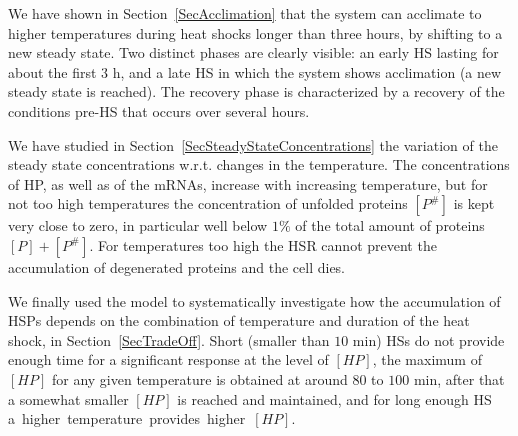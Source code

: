 \documentclass[oneside, 10pt, a4paper, twocolumn]{article}
\begin{document}
We have shown in Section~\ref{SecAcclimation} that the system can {acclimate} to higher temperatures during heat shocks longer than three hours, by shifting to a new steady state. Two distinct phases are clearly visible: an early HS lasting for about the first $3$ h, and a late HS in which the system shows acclimation (a new steady state is reached). The recovery phase is characterized by a recovery of the conditions pre-HS that occurs over several hours. 
 
We have studied in Section~\ref{SecSteadyStateConcentrations} the variation of the steady state concentrations w.r.t. changes in the temperature. The concentrations of HP, as well as of the mRNAs, increase with increasing temperature, but for not too high temperatures the concentration of unfolded proteins $\left[P^\#\right]$ is kept very close to zero, in particular well below $1\%$ of the total amount of proteins $\left[P\right] + \left[P^\#\right]$. For temperatures too high the HSR cannot prevent the accumulation of degenerated proteins and the cell dies.

We finally used the model to systematically investigate how the accumulation of HSPs depends on the combination of temperature and duration of the heat shock, in Section~\ref{SecTradeOff}. Short (smaller than $10$ min) HSs do not provide enough time for a significant response at the level of $\left[HP\right]$, the maximum of $\left[HP\right]$ for any given temperature is obtained at around $80$ to $100$ min, after that a somewhat smaller $\left[HP\right]$ is reached and maintained, and for long enough HS \mbox{a higher temperature provides higher $\left[HP\right]$.}




\end{document}
